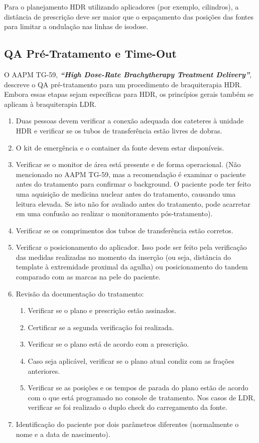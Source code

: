 \documentclass[11pt,a4paper]{article}
\newcounter{exemplo}
\begin{document}
	Para o planejamento HDR utilizando aplicadores (por exemplo, cilindros), a distância de prescrição deve ser maior que o espaçamento das posições das fontes para limitar a ondulação nas linhas de isodose.

\subsection*{QA Pré-Tratamento e Time-Out}

	O AAPM TG-59, \textbf{\textit{``High Dose-Rate Brachytherapy Treatment Delivery''}}, descreve o QA pré-tratamento para um procedimento de braquiterapia HDR. Embora essas etapas sejam específicas para HDR, os princípios gerais também se aplicam à braquiterapia LDR.

	\begin{enumerate}[label=\textcolor{CarnationPink}{\roman*.}]
		\item Duas pessoas devem verificar a conexão adequada dos cateteres à unidade HDR e verificar se os tubos de transferência estão livres de dobras.
		\item O kit de emergência e o container da fonte devem estar disponíveis.
		\item Verificar se o monitor de área está presente e de forma operacional. (Não mencionado no AAPM TG-59, mas a recomendação é examinar o paciente antes do tratamento para confirmar o background. O paciente pode ter feito uma aquisição de medicina nuclear antes do tratamento, causando uma leitura elevada. Se isto não for avaliado antes do tratamento, pode acarretar em uma confusão ao realizar o monitoramento pós-tratamento).
		\item Verificar se os comprimentos dos tubos de transferência estão corretos.
		\item Verificar o posicionamento do aplicador. Isso pode ser feito pela verificação das medidas realizadas no momento da inserção (ou seja, distância do template à extremidade proximal da agulha) ou posicionamento do tandem comparado com as marcas na pele do paciente.
		\item Revisão da documentação do tratamento:
			\begin{enumerate}[label=\textcolor{CarnationPink}{(\alph*)}]
				\item Verificar se o plano e prescrição estão assinados.
				\item Certificar se a segunda verificação foi realizada.
				\item Verificar se o plano está de acordo com a prescrição.
				\item Caso seja aplicável, verificar se o plano atual condiz com as frações anteriores.
				\item Verificar se as posições e os tempos de parada do plano estão de acordo com o que está programado no console de tratamento. Nos casos de LDR, verificar se foi realizado o duplo check do carregamento da fonte.
			\end{enumerate}
		\item Identificação do paciente por dois parâmetros diferentes (normalmente o nome e a data de nascimento).
	\end{enumerate}
\end{document}
